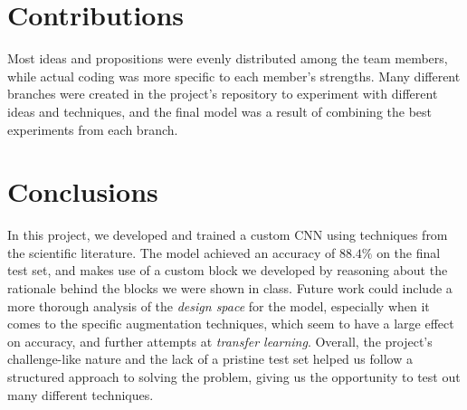 \documentclass[11pt]{article}
\begin{document}
\begin{multicols}{2}
      \section{Contributions}

      Most ideas and propositions were evenly distributed among the team members, while actual coding was more specific to each member's strengths. Many different branches were created in the project's repository to experiment with different ideas and techniques, and the final model was a result of combining the best experiments from each branch.

      \section{Conclusions}

      In this project, we developed and trained a custom CNN using techniques from the scientific literature. The model achieved an accuracy of $88.4\%$ on the final test set, and makes use of a custom block we developed by reasoning about the rationale behind the blocks we were shown in class. Future work could include a more thorough analysis of the \textit{design space} for the model, especially when it comes to the specific augmentation techniques, which seem to have a large effect on accuracy, and further attempts at \textit{transfer learning}. Overall, the project's challenge-like nature and the lack of a pristine test set helped us follow a structured approach to solving the problem, giving us the opportunity to test out many different techniques.

      
      

\end{multicols}
\end{document}
